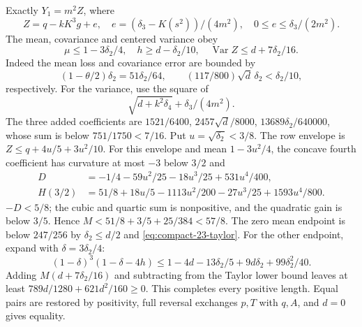 Exactly $Y_1=m^2Z$, where
\[
 Z=q-kK^3g+e,\quad e=(\delta_{3}-K(s^2))/(4m^2),\quad
 0\le e\le \delta_{3}/(2m^2).
\]
The mean, covariance and centered variance obey
\[
 \mu\le1-3\delta_{2}/4,\quad h\ge d-\delta_{2}/10,\quad
 \operatorname{Var}Z\le d+7\delta_{2}/16.
\]
Indeed the mean loss and covariance error are bounded by
\[
 (1-\theta/2)\delta_{2}=51\delta_{2}/64,\qquad
 (117/800)\sqrt d\,\delta_{2}<\delta_{2}/10,
\]
respectively.
For the variance, use the square of
\[
 \sqrt{d+k^2\delta_{4}}+\delta_{3}/(4m^2).
\]
The three added coefficients are
$1521/6400$, $2457\sqrt d/8000$, $13689\delta_{2}/640000$,
whose sum is below $751/1750<7/16$.
Put $u=\sqrt{\delta_{2}}<3/8$. The row envelope is
$Z\le q+4u/5+3u^2/10$.
For this envelope and mean $1-3u^2/4$, the concave fourth coefficient
has curvature at most $-3$ below $3/2$ and
\begin{align*}
 D&=-1/4-59u^2/25-18u^3/25+531u^4/400,\\
 H(3/2)&=51/8+18u/5-1113u^2/200-27u^3/25+1593u^4/800.
\end{align*}
$-D<5/8$; the cubic and quartic sum is nonpositive, and the quadratic
gain is below $3/5$. Hence $M<51/8+3/5+25/384<57/8$.
The zero mean endpoint is below $247/256$ by $\delta_{2}\le d/2$ and
\eqref{eq:compact-23-taylor}.
For the other endpoint, expand with $\delta=3\delta_{2}/4$:
\[
 (1-\delta)^3(1-\delta-4h)
 \le1-4d-13\delta_{2}/5+9d\delta_{2}+99\delta_{2}^2/40.
\]
Adding $M(d+7\delta_{2}/16)$ and subtracting from the Taylor lower bound
leaves at least $789d/1280+621d^2/160\ge0$.
This completes every positive length. Equal pairs are restored by
positivity, full reversal exchanges $p,T$ with $q,A$, and $d=0$ gives equality.
